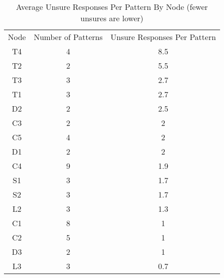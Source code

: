 \begin{table*}
\centering
\caption{Average Unsure Responses Per Pattern By Node (fewer unsures are lower)}\label{table:unsureResults}
\begin{tabular}{ccc}
Node & Number of Patterns & Unsure Responses Per Pattern \\
T4 &  4 & 8.5  \\
T2 &  2 & 5.5  \\
T3 &  3 & 2.7  \\
T1 &  3 & 2.7  \\
D2 &  2 & 2.5  \\
C3 &  2 & 2   \\
C5 &  4 & 2   \\
D1 &  2 & 2   \\
C4 &  9 & 1.9  \\
S1 &  3 & 1.7  \\
S2 &  3 & 1.7  \\
L2 &  3 & 1.3  \\
C1 &  8 & 1  \\
C2 &  5 & 1  \\
D3 &  2 & 1  \\
L3 &  3 &0.7  \\
\end{tabular}
\end{table*}
